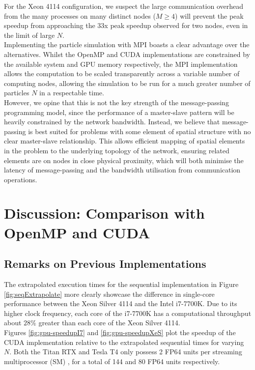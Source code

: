 \documentclass[12pt]{article}
\begin{document}
For the Xeon 4114 configuration, we suspect the large communication overhead from the many processes on many distinct nodes ($M \geq 4$) will prevent the peak speedup from approaching the 33x peak speedup observed for two nodes, even in the limit of large $N$.\\

Implementing the particle simulation with MPI boasts a clear advantage over the alternatives. Whilst the OpenMP and CUDA implementations are constrained by the available system and GPU memory respectively, the MPI implementation allows the computation to be scaled transparently across a variable number of computing nodes, allowing the simulation to be run for a much greater number of particles $N$ in a respectable time.\\

However, we opine that this is not the key strength of the message-passing programming model, since the performance of a master-slave pattern will be heavily constrained by the network bandwidth. Instead, we believe that message-passing is best suited for problems with some element of spatial structure with no clear master-slave relationship. This allows efficient mapping of spatial elements in the problem to the underlying topology of the network, ensuring related elements are on nodes in close physical proximity, which will both minimise the latency of message-passing and the bandwidth utilisation from communication operations.

\pagebreak

\section{Discussion: Comparison with OpenMP and CUDA}

\subsection{Remarks on Previous Implementations}
The extrapolated execution times for the sequential implementation in Figure \ref{fig:seqExtrapolate} more clearly showcase the difference in single-core performance between the Xeon Silver 4114 and the Intel i7-7700K. Due to its higher clock frequency, each core of the i7-7700K has a computational throughput about $28\%$ greater than each core of the Xeon Silver 4114.\\

Figures \ref{fig:gpu-speedupI7} and \ref{fig:gpu-speedupXeS} plot the speedup of the CUDA implementation relative to the extrapolated sequential times for varying $N$. Both the Titan RTX and Tesla T4 only possess 2 FP64 units per streaming multiprocessor (SM) \cite{turingarchi}, for a total of 144 and 80 FP64 units respectively.\\
\end{document}
